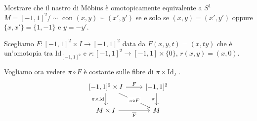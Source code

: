 \begin{eser}
    Mostrare che il nastro di Möbius è omotopicamente equivalente a \(S^{1}\) 
    \tcblower
    \(M = [-1,1]^2 / \sim \) con \({(x,y)}\sim {(x', y')} \) se e solo se
    \({(x,y)} = {(x',y')}\) oppure \(\{x, x'\} = \{1, -1\}  \) e \(y = -y'\).

    Scegliamo \(F : [-1,1]^2 \times  I \to [-1,1]^2\) data da \(F{(x, y, t)} =
    {(x, ty)}\) che è un'omotopia tra \(\mathrm{Id}_{[-1,1]^2} \) e \(r : [-1,
    1]^2 \to [-1, 1] \times \{0\} \), \(r{(x,y)} = {(x, 0)}\). 

    Vogliamo ora vedere \(\pi \circ F\) è costante sulle fibre di \(\pi \times
    \mathrm{Id}_I\) .%
\[\begin{tikzcd}
	{[-1,1]^2 \times I} & {[-1,1]^2} \\
	{M\times I} & M
	\arrow["F", from=1-1, to=1-2]
	\arrow["{\pi \times \mathrm{Id}}"', from=1-1, to=2-1]
	\arrow["{\pi \circ F}"{description}, from=1-1, to=2-2]
	\arrow["\pi"', from=1-2, to=2-2]
	\arrow["{\overline{F}}"', from=2-1, to=2-2]
\end{tikzcd}\]
\end{eser}

